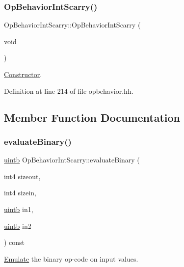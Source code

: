 \subsubsection{\texorpdfstring{OpBehaviorIntScarry()}{OpBehaviorIntScarry()}}
{\footnotesize\ttfamily Op\+Behavior\+Int\+Scarry\+::\+Op\+Behavior\+Int\+Scarry (\begin{DoxyParamCaption}\item[{void}]{ }\end{DoxyParamCaption})\hspace{0.3cm}{\ttfamily [inline]}}



\mbox{\hyperlink{class_constructor}{Constructor}}. 



Definition at line 214 of file opbehavior.\+hh.



\subsection{Member Function Documentation}
\mbox{\label{class_op_behavior_int_scarry_a293d6ddd7d38c03b3233fafd11ebef48}} 
\subsubsection{\texorpdfstring{evaluateBinary()}{evaluateBinary()}}
{\footnotesize\ttfamily \mbox{\hyperlink{types_8h_a2db313c5d32a12b01d26ac9b3bca178f}{uintb}} Op\+Behavior\+Int\+Scarry\+::evaluate\+Binary (\begin{DoxyParamCaption}\item[{int4}]{sizeout,  }\item[{int4}]{sizein,  }\item[{\mbox{\hyperlink{types_8h_a2db313c5d32a12b01d26ac9b3bca178f}{uintb}}}]{in1,  }\item[{\mbox{\hyperlink{types_8h_a2db313c5d32a12b01d26ac9b3bca178f}{uintb}}}]{in2 }\end{DoxyParamCaption}) const\hspace{0.3cm}{\ttfamily [virtual]}}



\mbox{\hyperlink{class_emulate}{Emulate}} the binary op-\/code on input values. 


